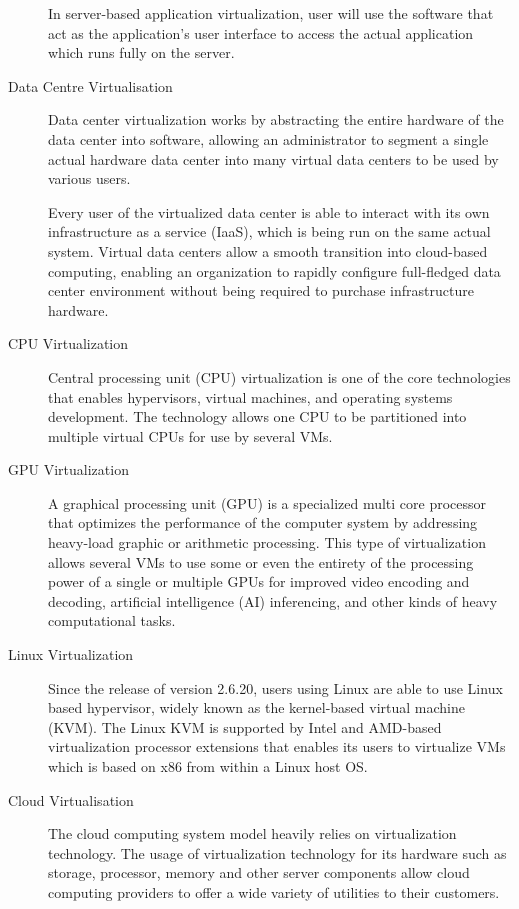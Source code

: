\documentclass[../index.tex]{subfiles}
\begin{document}
\begin{description}
		In server-based application virtualization, user will use the software that act as the
		application’s user interface to access the actual application which runs fully on the server.

	\item[Data Centre Virtualisation] Data center virtualization works by abstracting the entire
		hardware of the data center into software, allowing an administrator to segment a single actual
		hardware data center into many virtual data centers to be used by various users.

		Every user of the virtualized data center is able to interact with its own infrastructure as a
		service (IaaS), which is being run on the same actual system. Virtual data centers allow a
		smooth transition into cloud-based computing, enabling an organization to rapidly configure
		full-fledged data center environment without being required to purchase infrastructure hardware.

	\item[CPU Virtualization] Central processing unit (CPU) virtualization is one of the core
		technologies that enables hypervisors, virtual machines, and operating systems development. The
		technology allows one CPU to be partitioned into multiple virtual CPUs for use by several VMs.

	\item[GPU Virtualization] A graphical processing unit (GPU) is a specialized multi core processor
		that optimizes the performance of the computer system by addressing heavy-load graphic or
		arithmetic processing. This type of virtualization allows several VMs to use some or even the
		entirety of the processing power of a single or multiple GPUs for improved video encoding and
		decoding, artificial intelligence (AI) inferencing, and other kinds of heavy computational
		tasks.

	\item[Linux Virtualization] Since the release of version 2.6.20, users using Linux are able to use
		Linux based hypervisor, widely known as the kernel-based virtual machine (KVM). The Linux KVM is
		supported by Intel and AMD-based virtualization processor extensions that enables its users to
		virtualize VMs which is based on x86 from within a Linux host OS.

	\item[Cloud Virtualisation] The cloud computing system model heavily relies on virtualization
		technology. The usage of virtualization technology for its hardware such as storage, processor,
		memory and other server components allow cloud computing providers to offer a wide variety of
		utilities to their customers.

\end{description}
\end{document}
